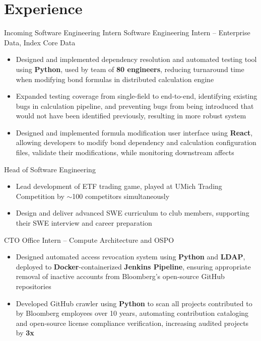 \documentclass[letterpaper,11pt]{article}
\begin{document}
\section{Experience}
{Incoming Software Engineering Intern}{}
{Software Engineering Intern -- Enterprise Data, Index Core Data}{}
\begin{itemize}
  \item Designed and implemented dependency resolution and automated testing
        tool using \textbf{Python}, used by team of \textbf{80 engineers},
        reducing turnaround time when modifying bond formulas in distributed
        calculation engine
  \item Expanded testing coverage from single-field to end-to-end, identifying
        existing bugs in calculation pipeline, and preventing bugs from being
        introduced that would not have been identified previously, resulting in
        more robust system
  \item Designed and implemented formula modification user interface using
        \textbf{React}, allowing developers to modify bond dependency and
        calculation configuration files, validate their modifications, while
        monitoring downstream affects
\end{itemize}
{Head of Software Engineering}{}
\begin{itemize}
  \item Lead development of ETF trading game, played at UMich Trading Competition
        by $\sim$100 competitors simultaneously
  \item Design and deliver advanced SWE curriculum to club members, supporting
        their SWE interview and career preparation
\end{itemize}
{CTO Office Intern -- Compute Architecture and OSPO}{}
\begin{itemize}
  \item Designed automated access revocation system using \textbf{Python} and
        \textbf{LDAP}, deployed to \textbf{Docker}-containerized
        \textbf{Jenkins Pipeline}, ensuring appropriate removal of inactive
        accounts from Bloomberg's open-source GitHub repositories
  \item Developed GitHub crawler using \textbf{Python} to scan all projects
        contributed to by Bloomberg employees over 10 years, automating
        contribution cataloging and open-source license compliance
        verification, increasing audited projects by \textbf{3x}
\end{itemize}
\end{document}
